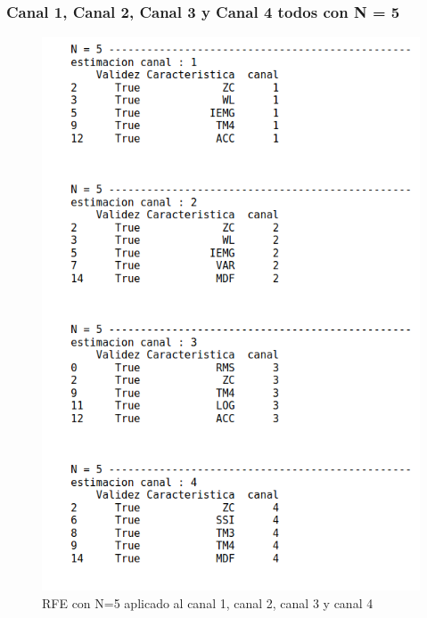         \subsubsection{Canal 1, Canal 2, Canal 3 y Canal 4 todos con N = 5} 
        \begin{figure}[ht]
            \centering
            \includegraphics[scale=0.25]{imagenes/N5 canales 1234.png}
            \caption{RFE con N=5 aplicado al canal 1, canal 2, canal 3 y canal 4}
            \label{fig:N5 canal 1234}
        \end{figure}
        
        
        \newpage
